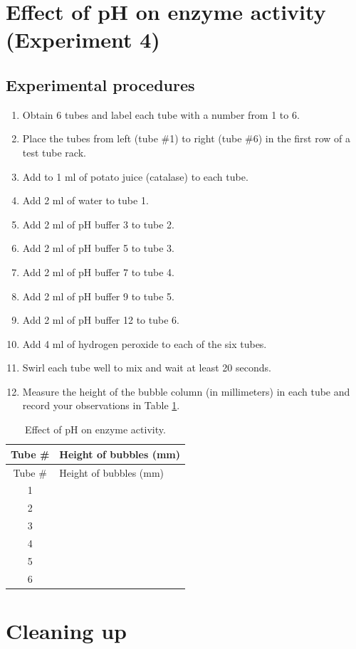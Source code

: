 \section{Effect of pH on enzyme activity (Experiment
4)}\label{effect-of-ph-on-enzyme-activity-experiment-4}

\subsection{Experimental procedures}\label{experimental-procedures-20}

\begin{enumerate}
\def\labelenumi{\arabic{enumi}.}
\tightlist
\item
  Obtain 6 tubes and label each tube with a number from 1 to 6.
\item
  Place the tubes from left (tube \#1) to right (tube \#6) in the first
  row of a test tube rack.
\item
  Add to 1 ml of potato juice (catalase) to each tube.
\item
  Add 2 ml of water to tube 1.
\item
  Add 2 ml of pH buffer 3 to tube 2.
\item
  Add 2 ml of pH buffer 5 to tube 3.
\item
  Add 2 ml of pH buffer 7 to tube 4.
\item
  Add 2 ml of pH buffer 9 to tube 5.
\item
  Add 2 ml of pH buffer 12 to tube 6.
\item
  Add 4 ml of hydrogen peroxide to each of the six tubes.
\item
  Swirl each tube well to mix and wait at least 20 seconds.
\item
  Measure the height of the bubble column (in millimeters) in each tube
  and record your observations in Table \ref{tab:pH}.
\end{enumerate}

\begin{longtable}[]{@{}cl@{}}
\caption{\label{tab:pH} Effect of pH on enzyme activity.}\tabularnewline
\toprule
Tube \# & Height of bubbles (mm)\tabularnewline
\midrule
\endfirsthead
\toprule
Tube \# & Height of bubbles (mm)\tabularnewline
\midrule
\endhead
1 &\tabularnewline
2 &\tabularnewline
3 &\tabularnewline
4 &\tabularnewline
5 &\tabularnewline
6 &\tabularnewline
\bottomrule
\end{longtable}

\section{Cleaning up}\label{cleaning-up-5}

